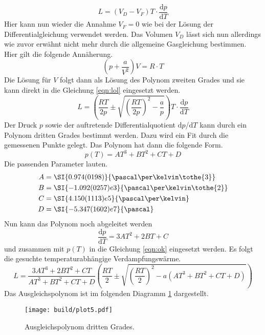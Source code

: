 \begin{equation}
    \label{eqn:lol}
L = (V_{D}-V_{F})T \cdot \frac{\text{d}p}{\text{d}T}
\end{equation}
Hier kann nun wieder die Annahme $V_{F} = 0$ wie bei der Lösung der Differentialgleichung verwendet werden. Das Volumen $V_{D}$ lässt sich nun allerdings wie zuvor erwähnt nicht mehr
durch die allgemeine Gasgleichung bestimmen. Hier gilt die folgende Annäherung.
\begin{equation}
\left( p + \frac{a}{V^{2}}\right)V = R \cdot T 
\end{equation}
Die Lösung für $V$ folgt dann als Lösung des Polynom zweiten Grades und sie kann direkt in die Gleichung \eqref{eqn:lol} eingesetzt werden.
\begin{equation}
    \label{eqn:ok}
L = \left(\frac{RT}{2p} \pm \sqrt{\left( \frac{RT}{2p}\right)^2 -\frac{a}{p}}\right) T \cdot \frac{\text{d}p}{\text{d}T}
\end{equation}
Der Druck $p$ sowie der auftretende Differentialquotient $\text{d}p$/$\text{d}T$ kann durch ein Polynom dritten Grades bestimmt werden. Dazu wird ein
Fit durch die gemessenen Punkte gelegt. Das Polynom hat dann die folgende Form.
\begin{equation}
p(T) = AT^{3} + BT^{2} + CT + D
\end{equation}
Die passenden Parameter lauten.
\begin{align*}
    A &= \SI{0.974(0198)}{\pascal\per\kelvin\tothe{3}} \\
    B &= \SI{-1.092(0257)e3}{\pascal\per\kelvin\tothe{2}} \\
    C &= \SI{4.150 (1113)e5}{\pascal\per\kelvin}\\
    D &=  \SI{-5.347 (1602)e7}{\pascal} \\
\end{align*}
Nun kann das Polynom noch abgeleitet werden
\begin{equation}
\frac{\text{d}p}{\text{d}T} = 3AT^{2} + 2BT + C
\end{equation}
und zusammen mit $p(T)$ in die Gleichung \eqref{eqn:ok} eingesetzt werden.
Es folgt die gesuchte temperaturabhängige Verdampfungswärme.
\begin{equation}
L = \frac{3AT^{3} + 2BT^{2} + CT}{AT^{3} + BT^{2} + CT + D}\left(\frac{RT}{2} \pm \sqrt{\left( \frac{RT}{2}\right)^{2} -a(AT^{3} + BT^{2} + CT + D)}\right) 
\end{equation}
Das Ausgleichspolynom ist im folgenden Diagramm \ref{fig:plot5} dargestellt.
\begin{figure}[h]
    \centering
    \texttt{[image: build/plot5.pdf]}
    \caption{Ausgleichspolynom dritten Grades.}
    \label{fig:plot5}
\end{figure}
